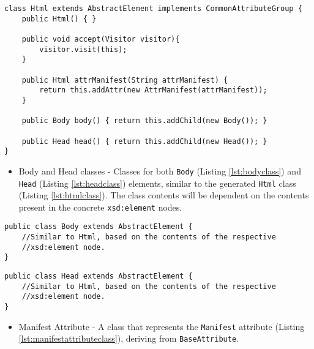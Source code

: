 
\begin{lstlisting}[caption={Html Element Class},captionpos=b,label={lst:htmlclass}]
class Html extends AbstractElement implements CommonAttributeGroup {
    public Html() { }
    
    public void accept(Visitor visitor){
		visitor.visit(this);    
    }
    
    public Html attrManifest(String attrManifest) {
        return this.addAttr(new AttrManifest(attrManifest));
    }
    
    public Body body() { return this.addChild(new Body()); }
        
    public Head head() { return this.addChild(new Head()); }
}
\end{lstlisting}

\begin{itemize}
	\item Body and Head classes - Classes for both \texttt{Body} (Listing \ref{lst:bodyclass}) and \texttt{Head} (Listing \ref{lst:headclass}) elements, similar to the generated \texttt{Html} class (Listing \ref{lst:htmlclass}). The class contents will be dependent on the contents present in the concrete \texttt{xsd:element} nodes.
\end{itemize}

\bigskip

\begin{minipage}{\linewidth}
\begin{lstlisting}[caption={Body Element Class},captionpos=b,label={lst:bodyclass}]
public class Body extends AbstractElement {
    //Similar to Html, based on the contents of the respective
    //xsd:element node.
}
\end{lstlisting}
\end{minipage}

\bigskip

\begin{minipage}{\linewidth}
\begin{lstlisting}[caption={Head Element Class},captionpos=b,label={lst:headclass}]
public class Head extends AbstractElement {
    //Similar to Html, based on the contents of the respective 
    //xsd:element node.
}
\end{lstlisting}
\end{minipage}

\begin{itemize}
	\item Manifest Attribute - A class that represents the \texttt{Manifest} attribute  (Listing \ref{lst:manifestattributeclass}), deriving from \texttt{BaseAttribute}.
\end{itemize}

